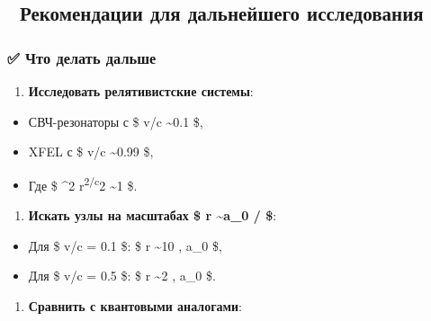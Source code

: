 \documentclass[11pt]{article}
\providecommand{\tightlist}{%
      \setlength{\itemsep}{0pt}\setlength{\parskip}{0pt}}
\begin{document}
\subsection{🎯 Рекомендации для дальнейшего
исследования}\label{ux440ux435ux43aux43eux43cux435ux43dux434ux430ux446ux438ux438-ux434ux43bux44f-ux434ux430ux43bux44cux43dux435ux439ux448ux435ux433ux43e-ux438ux441ux441ux43bux435ux434ux43eux432ux430ux43dux438ux44f-2}

\subsubsection{✅ Что делать
дальше}\label{ux447ux442ux43e-ux434ux435ux43bux430ux442ux44c-ux434ux430ux43bux44cux448ux435-1}

\begin{enumerate}
\def\labelenumi{\arabic{enumi}.}
\tightlist
\item
  \textbf{Исследовать релятивистские системы}:\\
\end{enumerate}

\begin{itemize}
\tightlist
\item
  СВЧ-резонаторы с \$ v/c \sim 0.1 \$,\\
\item
  XFEL с \$ v/c \sim 0.99 \$,\\
\item
  Где \$ \omega\^{}2 r\textsuperscript{2/c}2 \sim 1 \$.
\end{itemize}

\begin{enumerate}
\def\labelenumi{\arabic{enumi}.}
\setcounter{enumi}{1}
\tightlist
\item
  \textbf{Искать узлы на масштабах \$ r \sim a\_0 / \alpha \$}:\\
\end{enumerate}

\begin{itemize}
\tightlist
\item
  Для \$ v/c = 0.1 \$: \$ r \sim 10 , a\_0 \$,\\
\item
  Для \$ v/c = 0.5 \$: \$ r \sim 2 , a\_0 \$.
\end{itemize}

\begin{enumerate}
\def\labelenumi{\arabic{enumi}.}
\setcounter{enumi}{2}
\tightlist
\item
  \textbf{Сравнить с квантовыми аналогами}:\\
\end{enumerate}
\end{document}
